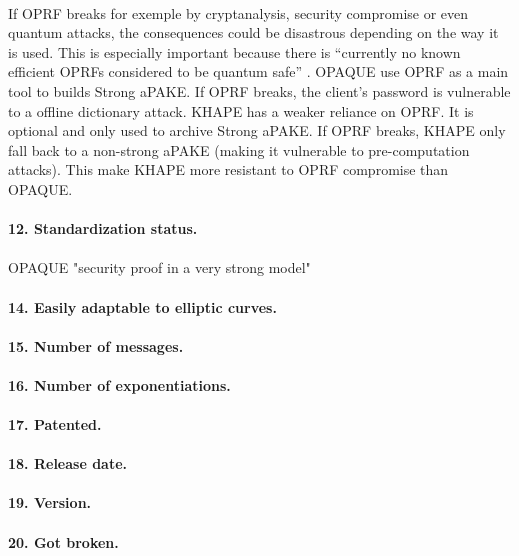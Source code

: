 \documentclass[../report.tex]{subfiles}
\begin{document}
\paragraph{}
If OPRF breaks for exemple by cryptanalysis, security compromise or even quantum attacks, the consequences could be disastrous depending on the way it is used. This is especially important because there is ``currently no known efficient OPRFs considered to be quantum safe'' \cite{KHAPE_Paper}.
OPAQUE use OPRF as a main tool to builds Strong aPAKE. If OPRF breaks, the client's password is vulnerable to a offline dictionary attack.
KHAPE has a weaker reliance on OPRF. It is optional and only used to archive Strong aPAKE. If OPRF breaks, KHAPE only fall back to a non-strong aPAKE (making it vulnerable to pre-computation attacks). 
This make KHAPE more resistant to OPRF compromise than OPAQUE. 

\paragraph{12. Standardization status.}

\paragraph{}
OPAQUE "security proof in a very strong model"

\paragraph{14. Easily adaptable to elliptic curves.}


\paragraph{15. Number of messages.}


\paragraph{16. Number of exponentiations.}


\paragraph{17. Patented.}


\paragraph{18. Release date.}


\paragraph{19. Version.}


\paragraph{20. Got broken.}
\end{document}
